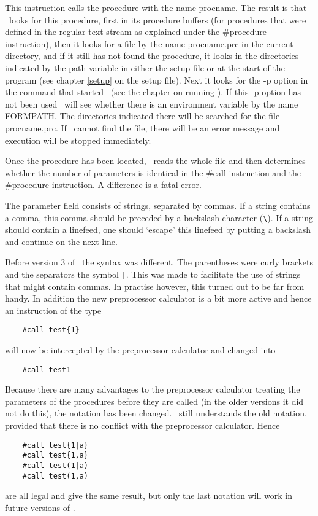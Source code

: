 \noindent This instruction calls the 
procedure with the name procname. The result is that \FORM\ 
looks for this procedure, first in its procedure 
buffers (for procedures that were defined in the 
regular text stream as explained under the \#procedure\index{\#procedure} 
instruction), then it looks for a file by the name procname.prc in the 
current directory, and if it still has not found the procedure, it looks in 
the directories indicated by the path\index{path} variable in either the setup 
file or at the start of the program (see chapter \ref{setup} on the setup 
file). Next it looks for the -p option in the command that started \FORM\ 
(see the chapter on running \FORM). If this -p option has not been used \FORM\ 
will see whether there is an environment variable by the name 
FORMPATH\index{FORMPATH}. The directories indicated there will be searched 
for the file procname.prc. If \FORM\ cannot find the file, there will be an 
error message and execution will be stopped immediately.

Once the procedure has been located, \FORM\ reads the whole file and then 
determines whether the number of parameters is identical in the 
\#call instruction and the \#procedure 
instruction. A difference is a fatal error.

The parameter field consists of strings, separated by commas. If a string 
contains a comma, this comma should be preceded by a 
backslash character (\verb:\:). If a string should contain 
a linefeed\index{linefeed}, one should `escape' this linefeed by putting a 
backslash and continue on the next line.

Before version 3 of \FORM\ the syntax was different. The parentheses 
were curly brackets and the separators the symbol \verb:|:. This was made 
to facilitate the use of strings that might contain commas. In practise 
however, this turned out to be far from handy. In addition the new 
preprocessor calculator is a bit more active and hence an instruction of 
the type
\begin{verbatim}
    #call test{1}
\end{verbatim}
will now be intercepted by the preprocessor calculator 
and changed into
\begin{verbatim}
    #call test1
\end{verbatim}
Because there are many advantages to the preprocessor calculator treating 
the parameters of the procedures before they are called (in the older 
versions it did not do this), the notation has been changed. \FORM\ still 
understands the old notation, provided that there is no conflict with the 
preprocessor calculator. Hence
\begin{verbatim}
    #call test{1|a}
    #call test{1,a}
    #call test(1|a)
    #call test(1,a)
\end{verbatim}
are all legal and give the same result, but only the last notation will 
work in future versions of \FORM\@.

